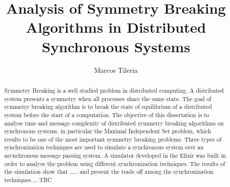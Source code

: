 \documentclass[11pt]{article} %
\title{Analysis of Symmetry Breaking Algorithms in Distributed Synchronous Systems}
\author{Marcos Tileria}
\theoremstyle{plain}
\theoremstyle{definition}
\begin{document}
\maketitle

\declaration

\begin{abstract}
  
 Symmetry Breaking is a well studied problem in distributed computing. A distributed system presents a symmetry when all processes share the same state. The goal of symmetry breaking algorithm  is to break the state of equilibrium of a distributed system before the start of a computation. The objective of this dissertation is to analyse time and message complexity of distributed symmetry breaking algorithms on synchronous systems, in particular the Maximal Independent Set problem, which results to be one of the most important symmetry breaking problems. Three types of synchronization techniques are used to simulate a synchronous system over an asynchronous message passing system. A simulator developed in the Elixir was built in order to analyse the problem using different synchronization techniques. The results of the simulation show that ..... and present the trade off among the synchronization techniques.... TBC
  

\end{abstract}






















\end{document}

